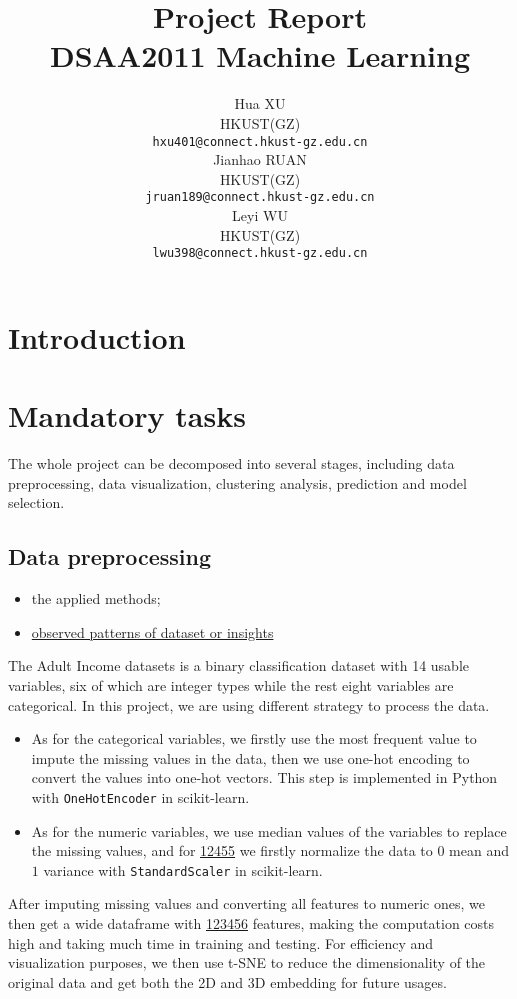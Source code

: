 \documentclass{article}
\title{Project Report \large \\ DSAA2011 Machine Learning}
\author{%
   Hua XU \\
   HKUST(GZ) \\
   \texttt{hxu401@connect.hkust-gz.edu.cn} \\
   \And
   Jianhao RUAN \\
   HKUST(GZ) \\
   \texttt{jruan189@connect.hkust-gz.edu.cn} \\
   \And
   Leyi WU \\
   HKUST(GZ) \\
   \texttt{lwu398@connect.hkust-gz.edu.cn} \\
}
\begin{document}
\maketitle

\section{Introduction}


\section{Mandatory tasks}

The whole project can be decomposed into several stages, including data preprocessing, data visualization, clustering analysis, prediction and model selection.

\subsection{Data preprocessing}

\begin{itemize}
    \item \checkmark the applied methods;
    \item \underline{observed patterns of dataset or insights}
\end{itemize}

The Adult Income datasets is a binary classification dataset with 14 usable variables, six of which are integer types while the rest eight variables are categorical. In this project, we are using different strategy to process the data.

\begin{itemize}
    \item As for the categorical variables, we firstly use the most frequent value to impute the missing values in the data, then we use one-hot encoding to convert the values into one-hot vectors. This step is implemented in Python with \texttt{OneHotEncoder} in scikit-learn.
    \item As for the numeric variables, we use median values of the variables to replace the missing values, and for \underline{12455} we firstly normalize the data to $0$ mean and $1$ variance with \texttt{StandardScaler} in scikit-learn.
\end{itemize}

After imputing missing values and converting all features to numeric ones, we then get a wide dataframe with \underline{123456} features, making the computation costs high and taking much time in training and testing. For efficiency and visualization purposes, we then use t-SNE to reduce the dimensionality of the original data and get both the 2D and 3D embedding for future usages.
\end{document}

